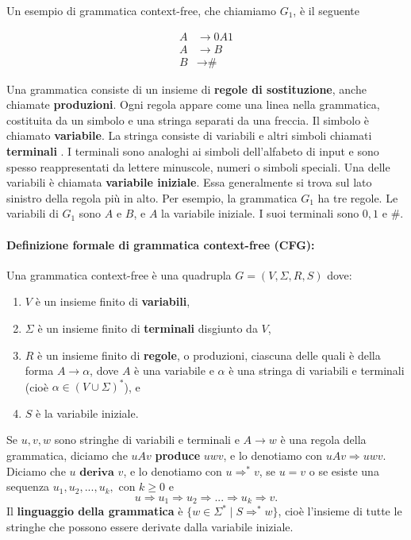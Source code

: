 \documentclass{article}
\begin{document}
Un esempio di grammatica context-free, che chiamiamo $G_1$, è il seguente

\begin{align*}
    A &\rightarrow 0A1 \\
    A &\rightarrow B \\
    B &\rightarrow \text{\#}
\end{align*}

Una grammatica consiste di un insieme di \textbf{regole di sostituzione}, anche chiamate \textbf{produzioni}. Ogni regola appare come una linea nella grammatica, costituita da un simbolo e una stringa separati da una freccia. Il simbolo è chiamato \textbf{variabile}. La stringa consiste di variabili e altri simboli chiamati \textbf{terminali}
. I terminali sono analoghi ai simboli dell'alfabeto di input e sono spesso reappresentati da lettere minuscole, numeri o simboli speciali. Una delle variabili è chiamata \textbf{variabile iniziale}. Essa generalmente si trova sul lato sinistro della regola più in alto.
Per esempio, la grammatica $G_1$ ha tre regole. Le variabili di $G_1$ sono $A$ e $B$, e $A$ la variabile iniziale. I suoi terminali sono $0,1$ e $\#$.
\vspace{2em}

\paragraph{Definizione formale di grammatica context-free (CFG):}
\text{  }

\begin{tcolorbox}[colback=yellow!10!white, colframe=yellow!50!black, title=Definizione 2.2]
    Una grammatica context-free è una quadrupla $G = (V,\Sigma,R,S)$ dove:
    \begin{enumerate}
        \item $V$ è un insieme finito di \textbf{variabili},
        \item $\Sigma$ è un insieme finito di \textbf{terminali} disgiunto da $V$,
        \item $R$ è un insieme finito di \textbf{regole}, o produzioni, ciascuna delle quali è della forma $A \rightarrow \alpha$, dove $A$ è una variabile e $\alpha$ è una stringa di variabili e terminali (cioè $\alpha \in (V \cup \Sigma)^{*}$), e
        \item $S$ è la variabile iniziale.
    \end{enumerate}
\end{tcolorbox}

Se $u,v,w$ sono stringhe di variabili e terminali e $A \rightarrow w$ è una regola della grammatica, diciamo che $uAv$ \textbf{produce} $uwv$, e lo denotiamo con $uAv \Rightarrow uwv$. Diciamo che $u \textbf{ deriva } v$, e lo denotiamo con $u \Rightarrow^* v$, se $u = v$ o se esiste una sequenza $u_1,u_2,...,u_k, \text{ con } k \geq 0$ e 
$$
u \Rightarrow u_1 \Rightarrow u_2 \Rightarrow ... \Rightarrow u_k \Rightarrow v.
$$
Il \textbf{linguaggio della grammatica} è $\{w \in \Sigma^{*} \mid S \Rightarrow^* w\}$, cioè l'insieme di tutte le stringhe che possono essere derivate dalla variabile iniziale.
\newpage
\end{document}
